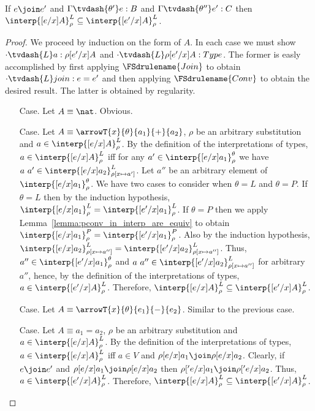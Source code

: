 \begin{lemma}
  \label{lemma:lconv_in_interp_are_equiv}
  If $e \join e'$ and $\Gamma \tvdash{\theta'} e:B$ and $\Gamma \tvdash{\theta''} e':C$ then 
  $\interp{[e/x]A}^L_\rho \subseteq \interp{[e'/x]A}^L_\rho$.
\end{lemma}
\begin{proof}
  We proceed by induction on the form of $A$.  In each case we must show 
  $\cdot \tvdash{L} a:\rho[e'/x]A$ and $\cdot \tvdash{L} \rho[e'/x]A:Type$.  The former is easly 
  accomplished by first applying $\FSdrulename{Join}$ to obtain $\cdot \tvdash{L} join:e = e'$ 
  and then applying $\FSdrulename{Conv}$ to obtain the desired result.  The latter is obtained
  by regularity.
  
  \begin{itemize}
  \item[Case.] Let $A \equiv \nat$.  Obvious.
    
  \item[Case.] Let $A \equiv \arrowT{x}{\theta}{a_1}{+}{a_2}$, $\rho$ be an arbitrary 
    substitution and $a \in \interp{[e/x]A}^L_\rho$.  By the definition of the interpretations 
    of types,
    $a \in \interp{[e/x]A}^L_\rho$ iff for any 
    $a' \in \interp{[e/x]a_1}^\theta_\rho$ we have
    $a\ a' \in \interp{[e/x]a_2}^L_{\rho[x \mapsto a']}$.
    Let $a''$ be an arbitrary element of $\interp{[e/x]a_1}^\theta_\rho$. We have two cases
    to consider when $\theta = L$ and $\theta = P$.  If $\theta = L$ then by the induction 
    hypothesis, 
    $\interp{[e/x]a_1}^L_\rho = \interp{[e'/x]a_1}^L_\rho$.  
    If $\theta = P$ then we apply  
    Lemma~\ref{lemma:pconv_in_interp_are_equiv} to obtain 
    $\interp{[e/x]a_1}^P_\rho = \interp{[e'/x]a_1}^P_\rho$.
    Also by the induction hypothesis,
    $\interp{[e/x]a_2}^L_{\rho[x \mapsto a'']} = \interp{[e'/x]a_2}^L_{\rho[x \mapsto a'']}$.  
    Thus, 
    $a'' \in \interp{[e'/x]a_1}^\theta_\rho$ and
    $a\ a'' \in \interp{[e'/x]a_2}^L_{\rho[x \mapsto a'']}$ for arbitrary $a''$, hence,
    by the definition of the interpretations of types,
    $a \in \interp{[e'/x]A}^L_\rho$.  Therefore, 
    $\interp{[e/x]A}^L_\rho \subseteq \interp{[e'/x]A}^L_\rho$.
    
  \item[Case.]  Let $A \equiv \arrowT{x}{\theta}{e_1}{-}{e_2}$.  Similar to the previous case.
    
  \item[Case.] Let $A \equiv a_1 = a_2$, $\rho$ be an arbitrary 
    substitution and $a \in \interp{[e/x]A}^L_\rho$.
    By the definition of the interpretations of types,
    $a \in \interp{[e/x]A}^L_\rho$ iff $a \in V$ and 
    $\rho[e/x]a_1 \join \rho[e/x]a_2$.
    Clearly, if $e \join e'$ and $\rho[e/x]a_1 \join \rho[e/x]a_2$ then 
    $\rho['e/x]a_1 \join \rho['e/x]a_2$.
    Thus, $a \in \interp{[e'/x]A}^L_\rho$.  Therefore,
    $\interp{[e/x]A}^L_\rho \subseteq \interp{[e'/x]A}^L_\rho$.
  \end{itemize}
\end{proof}

